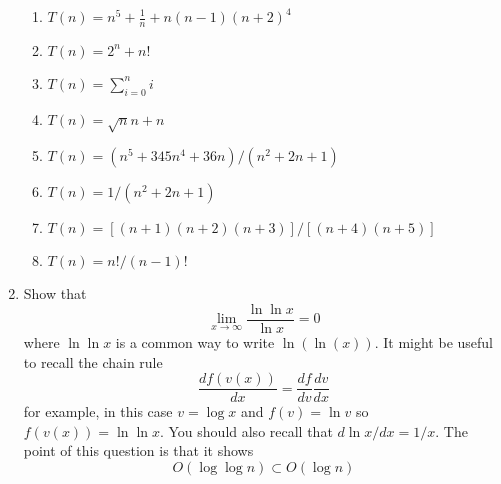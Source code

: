 \documentclass[11pt,a4paper]{scrartcl}
\newif\ifanswers
\begin{document}
\begin{enumerate}
\begin{enumerate}

\item $T(n)=n^5+\frac{1}{n}+n(n-1)(n+2)^4$
\item $T(n)=2^n+n!$
\item $T(n)=\sum_{i=0}^ni$
\item $T(n)=\sqrt{n}n+n$
\item $T(n)=(n^5+345n^4+36n)/(n^2+2n+1)$
\item $T(n)=1/(n^2+2n+1)$
\item $T(n)=[(n+1)(n+2)(n+3)]/[(n+4)(n+5)]$
\item $T(n)=n!/(n-1)!$
\end{enumerate}

\ifanswers 

\noindent Solution: So just take the leading term in $n$ each time

\begin{enumerate}

\item $\Theta(n^6)$
\item $\Theta(n!)$
\item $\Theta(n^2)$
\item $\Theta(\sqrt{n}n)$
\item $\Theta(n^3)$
\item $\Theta(1)$
\item $\Theta(n)$
\item $\Theta(n)$
\end{enumerate}
\fi

\item Show that 
$$
\lim_{x\rightarrow\infty}\frac{\ln{\ln{x}}}{\ln{x}}=0
$$
where $\ln\ln{x}$ is a common way to write $\ln(\ln(x))$. It might be useful to recall the chain rule 
$$
\frac{df(v(x))}{dx}=\frac{df}{dv}\frac{dv}{dx}
$$ for example, in this case $v=\log{x}$ and $f(v)=\ln{v}$ so
$f(v(x))=\ln{\ln{x}}$. You should also recall that $d\ln{x}/dx=1/x$. The
point of this question is that it shows
$$
O(\log{\log{n}}) \subset O(\log{n})
$$


\ifanswers

So 
$$
\frac{d\ln{\ln{x}}}{dx}=\frac{d\ln{\ln{x}}}{d\ln{x}}\frac{d{\ln{x}}}{dx}=\frac{1}{\ln{x}}\frac{1}{x}
$$
hence, by L'H\^{o}pidal's rule
$$
\lim_{x\rightarrow\infty}\frac{\ln{\ln{x}}}{\ln{x}}=\lim_{x\rightarrow\infty}\frac{1}{\ln{x}}=0
$$

\fi

\end{enumerate}
\end{document}
